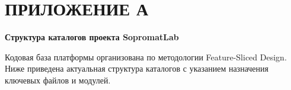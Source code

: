 ﻿%
\newpage
\section*{ПРИЛОЖЕНИЕ А}
\begin{center}
  \textbf{Структура каталогов проекта SopromatLab}
\end{center}

\vspace{1em}

Кодовая база платформы организована по методологии Feature-Sliced Design. Ниже приведена актуальная структура каталогов с указанием назначения ключевых файлов и модулей.

\vspace{1em}

